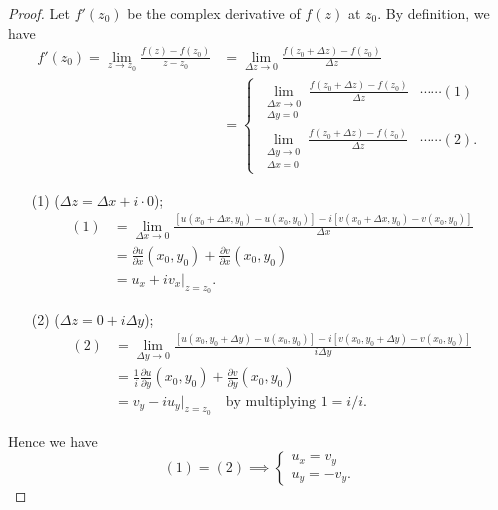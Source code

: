 \documentclass[12pt,openany]{book}
\theoremstyle{definition}
\newcommand{\of}[1]{\left( #1 \right)}
\begin{document}
	\begin{proof}
		Let $f'(z_0)$ be the complex derivative of $f(z)$ at $z_0$. By definition, we have \begin{align*}
		f'(z_0) = \lim_{z \to z_0} \frac{f(z) - f(z_0)}{z - z_0}&=\lim_{\Delta z\to 0}\frac{f\of{z_0+\Delta z}-f\of{z_0}}{\Delta z}\\&=\begin{cases}
		\displaystyle\lim\limits_{\substack{\Delta x\to 0\\ \Delta y=0}}\frac{f\of{z_0+\Delta z}-f\of{z_0}}{\Delta z} &\cdots\cdots(1)\\
		\displaystyle\lim\limits_{\substack{\Delta y\to 0\\ \Delta x=0}}\frac{f\of{z_0+\Delta z}-f\of{z_0}}{\Delta z}&\cdots\cdots(2).
		\end{cases}
		\end{align*}
		
		\begin{itemize}
			\item[(1)] ($\Delta z=\Delta x+i\cdot 0$);
			\begin{align*}
			(1)&=\lim\limits_{\Delta x\to 0}\frac{\left[u(x_0+\Delta x, y_0)-u\of{x_0,y_0}\right]-i\left[v(x_0+\Delta x,y_0)-v\of{x_0,y_0}\right]}{\Delta x}\\
			&=\frac{\partial u}{\partial x}\of{x_0,y_0}+\frac{\partial v}{\partial x}\of{x_0,y_0}\\
			&= u_x+iv_x\bigg|_{z=z_0}.
			\end{align*}
			\item[(2)] ($\Delta z=0+i\Delta y$);
			\begin{align*}
			(2)&=\lim\limits_{\Delta y\to 0}\frac{\left[u(x_0, y_0+\Delta y)-u\of{x_0,y_0}\right]-i\left[v(x_0,y_0+\Delta y)-v\of{x_0,y_0}\right]}{i\Delta y}\\
			&=\frac{1}{i}\frac{\partial u}{\partial y}\of{x_0,y_0}+\frac{\partial v}{\partial y}\of{x_0,y_0}\\
			&= v_y-iu_y\bigg|_{z=z_0}\quad\text{by multiplying $1=i/i$}.
			\end{align*}
		\end{itemize} Hence we have \[
		(1)=(2)\implies\begin{cases}
		u_x=v_y\\
		u_y=-v_y.
		\end{cases}
		\]
	\end{proof}
	
\end{document}
